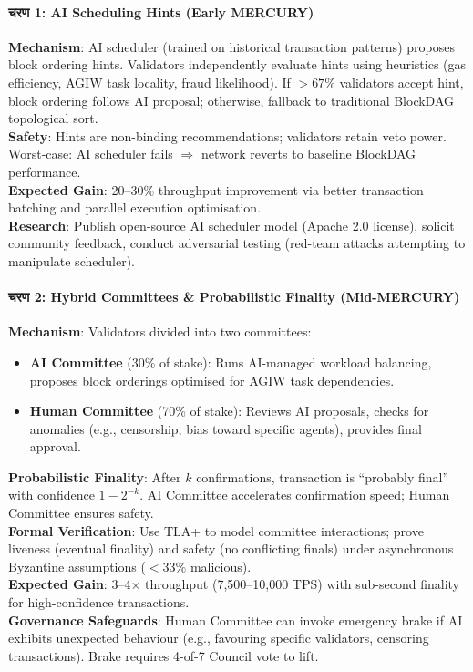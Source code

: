 \documentclass[11pt]{article}
\begin{document}
\paragraph{चरण 1: AI Scheduling Hints (Early MERCURY)}
\textbf{Mechanism}: AI scheduler (trained on historical transaction patterns) proposes block ordering hints. Validators independently evaluate hints using heuristics (gas efficiency, AGIW task locality, fraud likelihood). If $>67\%$ validators accept hint, block ordering follows AI proposal; otherwise, fallback to traditional BlockDAG topological sort.\\
\textbf{Safety}: Hints are non-binding recommendations; validators retain veto power. Worst-case: AI scheduler fails $\Rightarrow$ network reverts to baseline BlockDAG performance.\\
\textbf{Expected Gain}: 20--30\% throughput improvement via better transaction batching and parallel execution optimisation.\\
\textbf{Research}: Publish open-source AI scheduler model (Apache 2.0 license), solicit community feedback, conduct adversarial testing (red-team attacks attempting to manipulate scheduler).

\paragraph{चरण 2: Hybrid Committees \& Probabilistic Finality (Mid-MERCURY)}
\textbf{Mechanism}: Validators divided into two committees:
\begin{itemize}[noitemsep]
  \item \textbf{AI Committee} (30\% of stake): Runs AI-managed workload balancing, proposes block orderings optimised for AGIW task dependencies.
  \item \textbf{Human Committee} (70\% of stake): Reviews AI proposals, checks for anomalies (e.g., censorship, bias toward specific agents), provides final approval.
\end{itemize}
\textbf{Probabilistic Finality}: After $k$ confirmations, transaction is ``probably final'' with confidence $1 - 2^{-k}$. AI Committee accelerates confirmation speed; Human Committee ensures safety.\\
\textbf{Formal Verification}: Use TLA+ to model committee interactions; prove liveness (eventual finality) and safety (no conflicting finals) under asynchronous Byzantine assumptions ($<33\%$ malicious).\\
\textbf{Expected Gain}: 3--4$\times$ throughput (7,500--10,000 TPS) with sub-second finality for high-confidence transactions.\\
\textbf{Governance Safeguards}: Human Committee can invoke emergency brake if AI exhibits unexpected behaviour (e.g., favouring specific validators, censoring transactions). Brake requires 4-of-7 Council vote to lift.
\end{document}
